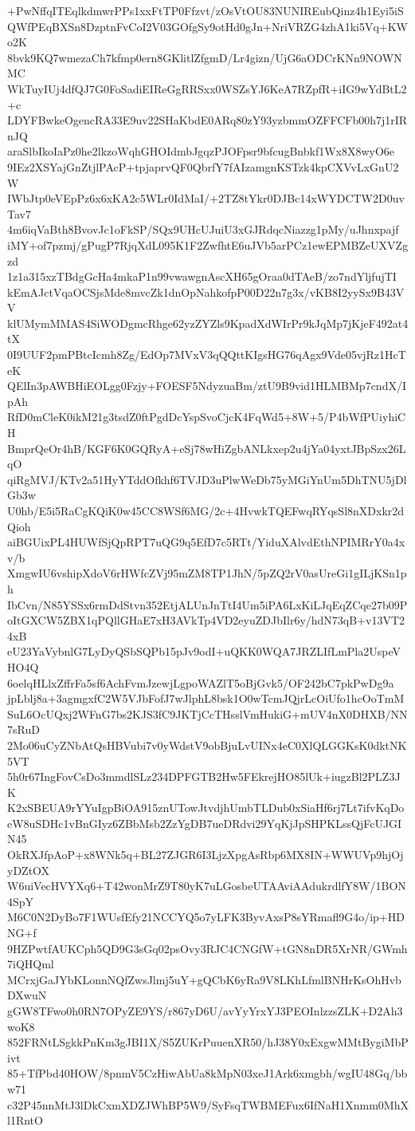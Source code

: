 +PwNffqITEqlkdmwrPPs1xxFtTP0Ffzvt/zOsVtOU83NUNIREubQinz4h1Eyi5iS
QWfPEqBXSn8DzptnFvCoI2V03GOfgSy9otHd0gJn+NriVRZG4zhA1ki5Vq+KWo2K
8bvk9KQ7wmezaCh7kfmp0ern8GKlitlZfgmD/Lr4gizn/UjG6aODCrKNn9NOWNMC
WkTuyIUj4dfQJ7G0FoSadiEIReGgRRSxx0WSZsYJ6KeA7RZpfR+iIG9wYdBtL2+c
LDYFBwkeOgencRA33E9uv22SHaKbdE0ARq80zY93yzbmmOZFFCFb00h7j1rIRnJQ
araSlbIkoIaPz0he2lkzoWqhGHOIdmbJgqzPJOFpsr9bfcugBnbkf1Wx8X8wyO6e
9IEz2XSYajGnZtjlPAcP+tpjaprvQF0QbrfY7fAIzamgnKSTzk4kpCXVvLxGnU2W
IWbJtp0eVEpPz6x6xKA2c5WLr0IdMaI/+2TZ8tYkr0DJBc14xWYDCTW2D0uvTav7
4m6iqVaBth8BvovJc1oFkSP/SQx9UHcUJuiU3xGJRdqcNiazzg1pMy/uJhnxpajf
iMY+of7pzmj/gPugP7RjqXdL095K1F2ZwfhtE6uJVb5arPCz1ewEPMBZeUXVZgzd
1z1a315xzTBdgGcHa4mkaP1n99vwawgnAscXH65gOraa0dTAeB/zo7ndYljfujTI
kEmAJctVqaOCSjsMde8mvcZk1dnOpNahkofpP00D22n7g3x/vKB8I2yySx9B43VV
klUMymMMAS4SiWODgmcRhge62yzZYZls9KpadXdWIrPr9kJqMp7jKjeF492at4tX
0I9UUF2pmPBtcIcmh8Zg/EdOp7MVxV3qQQttKIgsHG76qAgx9Vde05vjRz1HcTeK
QElIn3pAWBHiEOLgg0Fzjy+FOESF5NdyzuaBm/ztU9B9vid1HLMBMp7cndX/IpAh
RfD0mCleK0ikM21g3tsdZ0ftPgdDcYspSvoCjcK4FqWd5+8W+5/P4bWfPUiyhiCH
BmprQeOr4hB/KGF6K0GQRyA+eSj78wHiZgbANLkxep2u4jYa04yxtJBpSzx26LqO
qiRgMVJ/KTv2a51HyYTddOfkhf6TVJD3uPlwWeDb75yMGiYnUm5DhTNU5jDlGb3w
U0hb/E5i5RaCgKQiK0w45CC8WSf6MG/2c+4HvwkTQEFwqRYqsSl8nXDxkr2dQioh
aiBGUixPL4HUWfSjQpRPT7uQG9q5EfD7c5RTt/YiduXAlvdEthNPIMRrY0a4xv/b
XmgwIU6vshipXdoV6rHWfcZVj95mZM8TP1JhN/5pZQ2rV0asUreGi1gILjKSn1ph
IbCvn/N85YSSx6rmDdStvn352EtjALUnJnTtI4Um5iPA6LxKiLJqEqZCqe27b09P
oItGXCW5ZBX1qPQllGHaE7xH3AVkTp4VD2eyuZDJbIlr6y/hdN73qB+v13VT24xB
eU23YaVybnlG7LyDyQSbSQPb15pJv9odI+uQKK0WQA7JRZLIfLmPla2UspeVHO4Q
6oelqHLlxZffrFa5sf6AchFvmJzewjLgpoWAZlT5oBjGvk5/OF242bC7pkPwDg9a
jpLblj8a+3agmgxfC2W5VJbFofJ7wJlphL8bsk1O0wTcmJQjrLcOiUfo1hcOoTmM
SuL6OcUQxj2WFnG7bs2KJS3fC9JKTjCcTHsslVmHukiG+mUV4nX0DHXB/NN7sRuD
2Mo06uCyZNbAtQsHBVubi7v0yWdstV9obBjuLvUINx4eC0XlQLGGKsK0dktNK5VT
5h0r67IngFovCsDo3mmdlSLz234DPFGTB2Hw5FEkrejHO85lUk+iugzBl2PLZ3JK
K2xSBEUA9rYYuIgpBiOA915znUTowJtvdjhUmbTLDub0xSiaHf6rj7Lt7ifvKqDo
eW8uSDHc1vBnGIyz6ZBbMsb2ZzYgDB7ueDRdvi29YqKjJpSHPKLssQjFcUJGIN45
OkRXJfpAoP+x8WNk5q+BL27ZJGR6I3LjzXpgAsRbp6MX8IN+WWUVp9hjOjyDZtOX
W6uiVecHVYXq6+T42wonMrZ9T80yK7uLGosbeUTAAviAAdukrdlfY8W/1BON4SpY
M6C0N2DyBo7F1WUsfEfy21NCCYQ5o7yLFK3ByvAxsP8sYRmafl9G4o/ip+HDNG+f
9HZPwtfAUKCph5QD9G3sGq02psOvy3RJC4CNGfW+tGN8nDR5XrNR/GWmh7iQHQml
MCrxjGaJYbKLonnNQfZwsJlmj5uY+gQCbK6yRa9V8LKhLfmlBNHrKsOhHvbDXwuN
gGW8TFwo0h0RN7OPyZE9YS/r867yD6U/avYyYrxYJ3PEOInlzzsZLK+D2Ah3woK8
852FRNtLSgkkPnKm3gJBI1X/S5ZUKrPuuenXR50/hJ38Y0xExgwMMtBygiMbPivt
85+TfPbd40HOW/8pnmV5CzHiwAbUa8kMpN03xeJ1Ark6xmgbh/wgIU48Gq/bbw71
c32P45nnMtJ3lDkCxmXDZJWhBP5W9/SyFsqTWBMEFux6IfNaH1Xnmm0MhXl1RntO
